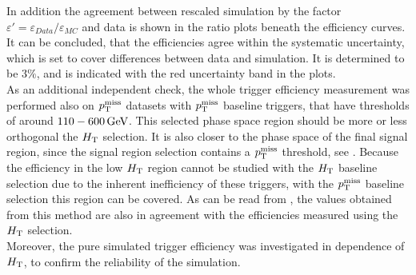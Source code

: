 In addition the agreement between rescaled simulation by the factor $\varepsilon'=\varepsilon_{Data}/\varepsilon_{MC}$ and data is shown in the ratio plots beneath the efficiency curves. It can be concluded, that the efficiencies agree within the systematic uncertainty, which is set to cover differences between data and simulation. It is determined to be $3\%$, and is indicated with the red uncertainty band in the plots.\\

As an additional independent check, the whole trigger efficiency measurement was performed also on $p_{\mathrm{T}}^\text{miss}$ datasets with $p_{\mathrm{T}}^\text{miss}$ baseline triggers, that have thresholds of around $110-600\,\text{Ge\hspace{-.08em}V}$. This selected phase space region should be more or less orthogonal the $H_{\mathrm{T}}$ selection. It is also closer to the phase space of the final signal region, since the signal region selection contains a $p_{\mathrm{T}}^\text{miss}$ threshold, see . Because the efficiency in the low $H_{\mathrm{T}}$ region cannot be studied with the $H_{\mathrm{T}}$ baseline selection due to the inherent inefficiency of these triggers, with the $p_{\mathrm{T}}^\text{miss}$ baseline selection this region can be covered. As can be read from , the values obtained from this method are also in agreement with the efficiencies measured using the $H_{\mathrm{T}}$ selection.\\
Moreover, the pure simulated trigger efficiency was investigated in dependence of $H_{\mathrm{T}}$, to confirm the reliability of the simulation.
